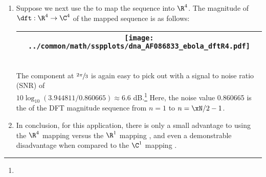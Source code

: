 \begin{example}
\begin{enumerate}
  \item \label{item:dftebola_R4}
    Suppose we next use the   to map
    the sequence into $\R^4$.
    The magnitude of $\dft:\R^4\to\C^4$ of the mapped sequence is as follows:
    \\\begin{tabular}{|>{\scs}c|}
         \hline
         \texttt{[image: ../common/math/sspplots/dna\_AF086833\_ebola\_dftR4.pdf]}%
       \\\hline
    \end{tabular}\\
    The component at $\sfrac{2\pi}{3}$ is again easy to pick out with a signal to noise ratio (SNR) of\\ 
    $10\log_{10}(3.944811/0.860665)\approx 6.6$ dB.\footnote{}
    Here, the noise value 0.860665 is the  of the DFT magnitude 
    sequence from $n=1$ to $n=\xN/2-1$.

  \item In conclusion, for this application, there is only a small advantage to using 
        the $\R^4$ mapping 
        versus the $\R^1$ mapping , 
        and even a demonstrable disadvantage when compared to the $\C^1$ mapping .
\end{enumerate}
\end{example}


